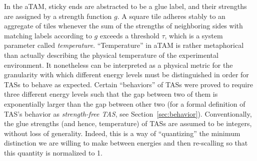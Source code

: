 \documentclass{article}
\theoremstyle{remark}
\theoremstyle{definition}
\begin{document}
In the aTAM, sticky ends are abstracted to be a glue label, and their strengths are assigned by a strength function $g$. 
A square tile adheres stably to an aggregate of tiles whenever the sum of the strengths of neighboring sides with matching labels according to $g$ exceeds a threshold $\tau$, which is a system parameter called {\it temperature}. 
``Temperature'' in aTAM is rather metaphorical than actually describing the physical temperature of the experimental environment. 
It nonetheless can be interpreted as a physical metric for the granularity with which different energy levels must be distinguished in order for TASs to behave as expected. 
Certain ``behaviors'' of TASs were proved to require three different energy levels such that the gap between two of them is exponentially larger than the gap between other two \cite{ChenDotySeki2011} (for a formal definition of TAS's behavior as {\it strength-free TAS}, see Section~\ref{sec:behavior}). 
Conventionally, the glue strengths (and hence, temperature) of TASs are assumed to be integers, without loss of generality. 
Indeed, this is a way of ``quantizing'' the minimum distinction we are willing to make between energies and then re-scalling so that this quantity is normalized to 1. 
\end{document}
